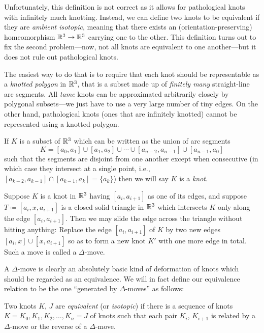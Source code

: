 Unfortunately, this definition is not correct as it allows for
pathological knots with infinitely much knotting. Instead, we can define
two knots to be equivalent if they are \emph{ambient isotopic}, meaning
that there exists an (orientation-preserving) homeomorphism
$\mathbb{R}^3\to\mathbb{R}^3$ carrying one to the other. This definition turns out to
fix the second problem---now, not all knots are equivalent to one
another---but it does not rule out pathological knots.

The easiest way to do that is to require that each knot should be
representable as a \emph{knotted polygon} in $\mathbb{R}^3$, that is a subset
made up of \emph{finitely many} straight-line arc segments. All \emph{tame}
knots can be approximated arbitrarily closely by polygonal subsets---we
just have to use a very large number of tiny edges. On the other hand,
pathological knots (ones that are infinitely knotted) cannot be represented
using a knotted polygon.

\begin{definition}
  If $K$ is a subset of $\mathbb{R}^3$ which can be written as the union of arc
  segments
  \[
    K=[a_0,a_1]\cup[a_1,a_2]\cup\dotsb\cup[a_{n-2},a_{n-1}]\cup[a_{n-1},a_0]
  \]
  such that the segments are disjoint from one another except when
  consecutive (in which case they intersect at a single point, i.e.,
  $[a_{k-2},a_{k-1}]\cap [a_{k-1},a_k]=\{a_k\}$) then we will say $K$ is a
  \emph{knot}.
\end{definition}

\begin{definition}
  Suppose $K$ is a knot in $\mathbb{R}^3$ having $[a_i,a_{i+1}]$ as one of its
  edges, and suppose $T\coloneq[a_i,x,a_{i+1}]$ is a closed solid triangle
  in $\mathbb{R}^3$ which intersects $K$ only along the edge
  $[a_i,a_{i+1}]$. Then we may slide the edge across the triangle without
  hitting anything: Replace the edge $[a_i,a_{i+1}]$ of $K$ by two new
  edges $[a_i,x]\cup[x,a_{i+1}]$ so as to form a new knot $K'$ with one
  more edge in total. Such a move is called a $\Delta$-move.
\end{definition}

A $\Delta$-move is clearly an absolutely basic kind of deformation of knots
which should be regarded as an equivalence. We will in fact define our
equivalence relation to be the one ``generated by $\Delta$-moves'' as
follows:

\begin{definition}
  Two knots $K$, $J$ are \emph{equivalent} (or \emph{isotopic}) if there is
  a sequence of knots $K=K_0,K_1,K_2,\dotsc,K_n=J$ of knots such that each
  pair $K_i$, $K_{i+1}$ is related by a $\Delta$-move or the reverse of a
  $\Delta$-move.
\end{definition}

